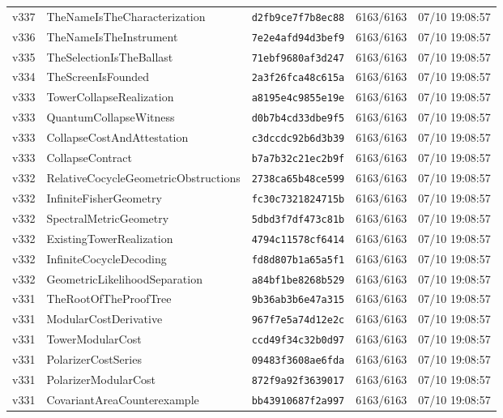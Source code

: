 \documentclass[11pt]{article}
\theoremstyle{definition}\newtheorem{deriv}{Derivation}
\begin{document}
{\begin{longtable}{@{}lllll@{}}
v337 & TheNameIsTheCharacterization & \texttt{d2fb9ce7f7b8ec88} & 6163/6163 & 07/10 19:08:57 \\
v336 & TheNameIsTheInstrument & \texttt{7e2e4afd94d3bef9} & 6163/6163 & 07/10 19:08:57 \\
v335 & TheSelectionIsTheBallast & \texttt{71ebf9680af3d247} & 6163/6163 & 07/10 19:08:57 \\
v334 & TheScreenIsFounded & \texttt{2a3f26fca48c615a} & 6163/6163 & 07/10 19:08:57 \\
v333 & TowerCollapseRealization & \texttt{a8195e4c9855e19e} & 6163/6163 & 07/10 19:08:57 \\
v333 & QuantumCollapseWitness & \texttt{d0b7b4cd33dbe9f5} & 6163/6163 & 07/10 19:08:57 \\
v333 & CollapseCostAndAttestation & \texttt{c3dccdc92b6d3b39} & 6163/6163 & 07/10 19:08:57 \\
v333 & CollapseContract & \texttt{b7a7b32c21ec2b9f} & 6163/6163 & 07/10 19:08:57 \\
v332 & RelativeCocycleGeometricObstructions & \texttt{2738ca65b48ce599} & 6163/6163 & 07/10 19:08:57 \\
v332 & InfiniteFisherGeometry & \texttt{fc30c7321824715b} & 6163/6163 & 07/10 19:08:57 \\
v332 & SpectralMetricGeometry & \texttt{5dbd3f7df473c81b} & 6163/6163 & 07/10 19:08:57 \\
v332 & ExistingTowerRealization & \texttt{4794c11578cf6414} & 6163/6163 & 07/10 19:08:57 \\
v332 & InfiniteCocycleDecoding & \texttt{fd8d807b1a65a5f1} & 6163/6163 & 07/10 19:08:57 \\
v332 & GeometricLikelihoodSeparation & \texttt{a84bf1be8268b529} & 6163/6163 & 07/10 19:08:57 \\
v331 & TheRootOfTheProofTree & \texttt{9b36ab3b6e47a315} & 6163/6163 & 07/10 19:08:57 \\
v331 & ModularCostDerivative & \texttt{967f7e5a74d12e2c} & 6163/6163 & 07/10 19:08:57 \\
v331 & TowerModularCost & \texttt{ccd49f34c32b0d97} & 6163/6163 & 07/10 19:08:57 \\
v331 & PolarizerCostSeries & \texttt{09483f3608ae6fda} & 6163/6163 & 07/10 19:08:57 \\
v331 & PolarizerModularCost & \texttt{872f9a92f3639017} & 6163/6163 & 07/10 19:08:57 \\
v331 & CovariantAreaCounterexample & \texttt{bb43910687f2a997} & 6163/6163 & 07/10 19:08:57 \\

\end{longtable}}
\end{document}
